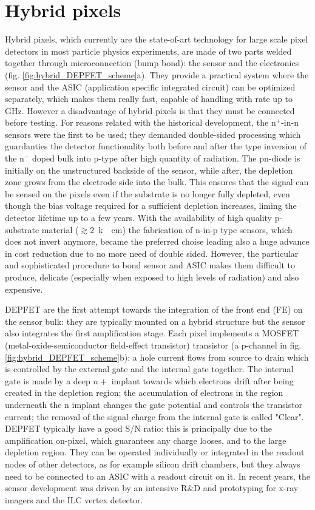 \section{Hybrid pixels}
   Hybrid pixels, which currently are the state-of-art technology for large scale pixel detectors in most particle physics experiments, are made of two parts welded together through microconnection (bump bond): the sensor and the electronics (fig. \ref{fig:hybrid_DEPFET_scheme}a). 
   They provide a practical system where the sensor and the ASIC (application specific integrated circuit) can be optimized separately, which makes them really fast, capable of handling with rate up to \si{GHz}. However a disadvantage of hybrid pixels is that they must be connected before testing.
   For reasons related with the historical development, the n$^+$-in-n sensors were the first to be used; they demanded double-sided processing which guardanties the detector functionality both before and after the type inversion of the n$^-$ doped bulk into p-type after high quantity of radiation.
   The pn-diode is initially on the unstructured backside of the sensor, while after, the depletion zone grows from the electrode side into the bulk. This ensures that the signal can be sensed on the pixels even if the substrate is no longer fully depleted, even though the bias voltage required for a sufficient depletion increases, liming the detector lifetime up to a few years.
   With the availability of high quality p-substrate material ($\gtrsim$\SI{2}{k\Omega cm}) the fabrication of n-in-p type sensors, which does not invert anymore, became the preferred choise leading also a huge advance in cost reduction due to no more need of double sided.
   However, the particular and sophisticated procedure to bond sensor and ASIC makes them difficult to produce, delicate (especially when exposed to high levels of radiation) and also expensive. 

   DEPFET are the first attempt towards the integration of the front end (FE) on the sensor bulk: they are typically mounted on a hybrid structure but the sensor also integrates the first amplification stage.
   Each pixel implements a MOSFET (metal-oxide-semiconductor field-effect transistor) transistor (a p-channel in fig. \ref{fig:hybrid_DEPFET_scheme}b): a hole current flows from source to drain which is controlled by the external gate and the internal gate together. The internal gate is made by a deep $n+$ implant towards which electrons drift after being created in the depletion region; the accumulation of electrons in the region underneath the n implant changes the gate potential and controls the transistor current; the removal of the signal charge from the internal gate is called "Clear". 
   DEPFET typically have a good S/N ratio: this is principally due to the amplification on-pixel, which guarantees any charge looses, and to the large depletion region. They can be operated individually or integrated in the readout nodes of other detectors, as for example silicon drift chambers, but they always need to be connected to an ASIC with a readout circuit on it. 
   In recent years, the sensor development was driven by an intensive R$\&$D and prototyping for x-ray imagers and the ILC vertex detector. 
   

